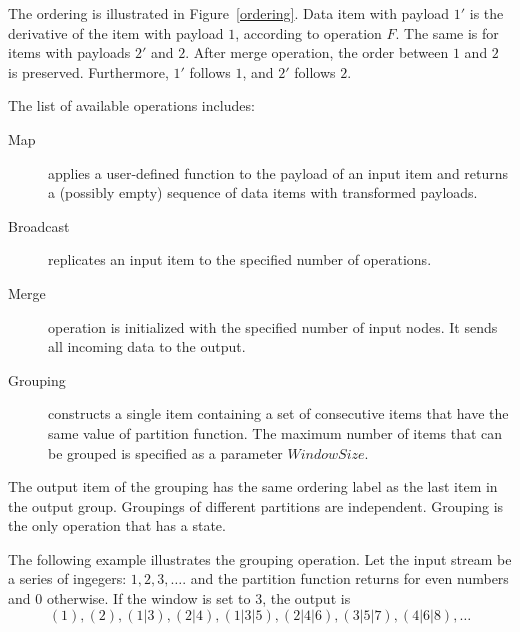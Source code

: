 The ordering is illustrated  in Figure~\ref{ordering}. Data item with payload $1'$ is the derivative of the item with payload $1$, according to operation $F$. The same is for items with payloads $2'$ and $2$. After merge operation, the order between $1$ and $2$ is preserved. Furthermore, $1'$ follows $1$, and $2'$ follows $2$.  



The list of available operations includes:
\begin {description}
\item [Map] applies a user-defined function to the payload of an input item and returns a (possibly empty) sequence of data items with transformed payloads. 

\item [Broadcast] replicates an input item to the specified number of operations.

\item [Merge] operation is initialized with the specified number of input nodes. It sends all incoming data to the output.

\item [Grouping] constructs a single item containing a set of consecutive items that have the same value of partition function. The maximum number of items that can be grouped is specified as a parameter  $Window Size.$ 
\end {description}

The output item of the grouping has the same ordering label as the last item in the output group. 
Groupings of different partitions are independent. 
Grouping is the only operation that has a state.


The following example illustrates  the grouping operation. 
Let the input stream be a series of ingegers: $ 1,2,3, \ldots$. and the  partition function returns for even numbers and 0 otherwise. If the window is set to 3, the output is 
$$(1), (2), (1|3), (2|4), (1|3|5), (2|4|6), (3|5|7), (4|6|8), \ldots$$

